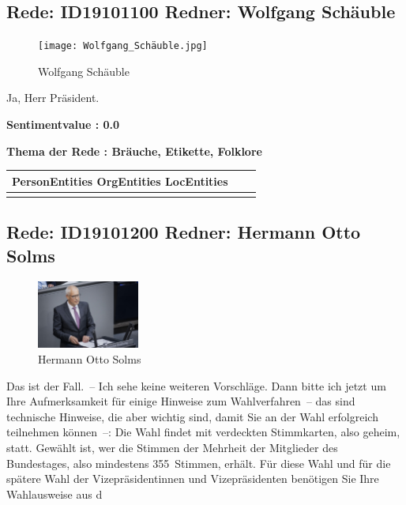 \documentclass[a4paper,11pt]{article}
\begin{document}
\subsection{Rede: ID19101100  Redner: Wolfgang Schäuble}

\begin{figure}[ht]

\centering

\texttt{[image: Wolfgang\_Schäuble.jpg]}

\caption{Wolfgang Schäuble}

\end{figure}

Ja, Herr Präsident.

\textbf{Sentimentvalue : 0.0}

\textbf{Thema der Rede : Bräuche, Etikette, Folklore}
\vspace*{1cm}

\begin{table}[ht]
\centering
\begin{tabular}{||c | c | c||}
\hline
PersonEntities  OrgEntities  LocEntities \\ 

\hline\hline
\makecell{} 
\makecell{} 
\makecell{}\\
\hline
\end{tabular}
\end{table}
\clearpage


\subsection{Rede: ID19101200  Redner: Hermann Otto Solms}

\begin{figure}[ht]

\centering

\includegraphics[width=0.3\textwidth]{Hermann_Otto_Solms.jpg}

\caption{Hermann Otto Solms}

\end{figure}

Das ist der Fall. – Ich sehe keine weiteren Vorschläge. Dann bitte ich jetzt um Ihre Aufmerksamkeit für einige Hinweise zum Wahlverfahren – das sind technische Hinweise, die aber wichtig sind, damit Sie an der Wahl erfolgreich teilnehmen können –: Die Wahl findet mit verdeckten Stimmkarten, also geheim, statt. Gewählt ist, wer die Stimmen der Mehrheit der Mitglieder des Bundestages, also mindestens 355 Stimmen, erhält. Für diese Wahl und für die spätere Wahl der Vizepräsidentinnen und Vizepräsidenten benötigen Sie Ihre Wahlausweise aus d
\end{document}
